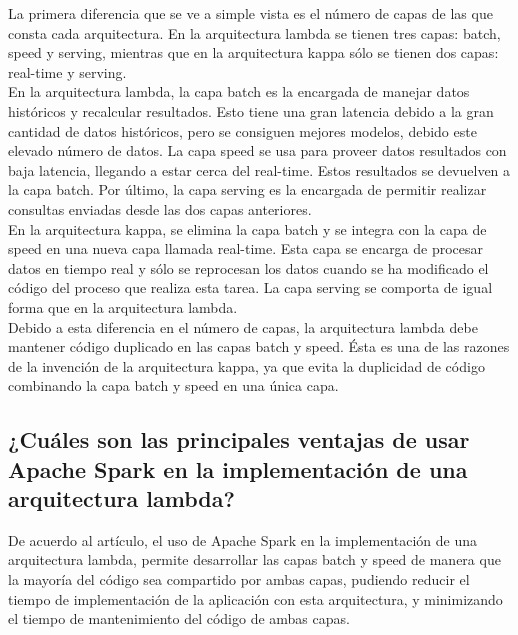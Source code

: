 \documentclass[12pt,a4paper,twoside,openright,titlepage,final]{article}
\begin{document}
La primera diferencia que se ve a simple vista es el número de capas de las que consta cada arquitectura. En la arquitectura lambda se tienen tres capas: batch, speed y serving, mientras que en la arquitectura kappa sólo se tienen dos capas: real-time y serving.\\

En la arquitectura lambda, la capa batch es la encargada de manejar datos históricos y recalcular resultados. Esto tiene una gran latencia debido a la gran cantidad de datos históricos, pero se consiguen mejores modelos, debido este elevado número de datos. La capa speed se usa para proveer datos resultados con baja latencia, llegando a estar cerca del real-time. Estos resultados se devuelven a la capa batch. Por último, la capa serving es la encargada de permitir realizar consultas enviadas desde las dos capas anteriores.\\

En la arquitectura kappa, se elimina la capa batch y se integra con la capa de speed en una nueva capa llamada real-time. Esta capa se encarga de procesar datos en tiempo real y sólo se reprocesan los datos cuando se ha modificado el código del proceso que realiza esta tarea. La capa serving se comporta de igual forma que en la arquitectura lambda.\\

Debido a esta diferencia en el número de capas, la arquitectura lambda debe mantener código duplicado en las capas batch y speed. Ésta es una de las razones de la invención de la arquitectura kappa, ya que evita la duplicidad de código combinando la capa batch y speed en una única capa.  

\subsection{¿Cuáles son las principales ventajas de usar Apache Spark en la implementación de una arquitectura lambda?}

De acuerdo al artículo, el uso de Apache Spark en la implementación de una arquitectura lambda, permite desarrollar las capas batch y speed de manera que la mayoría del código sea compartido por ambas capas, pudiendo reducir el tiempo de implementación de la aplicación con esta arquitectura, y minimizando el tiempo de mantenimiento del código de ambas capas.
\end{document}

